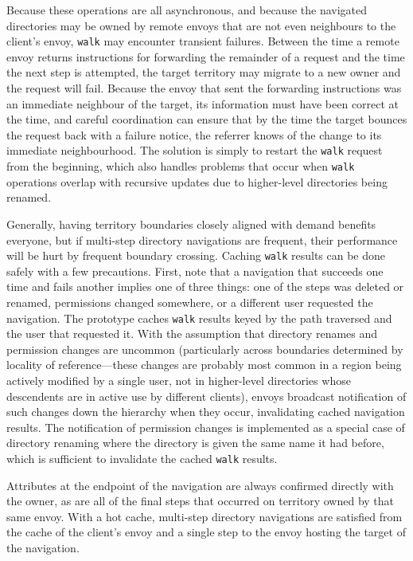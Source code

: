 Because these operations are all asynchronous, and because the navigated directories may be owned by remote envoys that are not even neighbours to the client's envoy, \texttt{walk} may encounter transient failures. Between the time a remote envoy returns instructions for forwarding the remainder of a request and the time the next step is attempted, the target territory may migrate to a new owner and the request will fail. Because the envoy that sent the forwarding instructions was an immediate neighbour of the target, its information must have been correct at the time, and careful coordination can ensure that by the time the target bounces the request back with a failure notice, the referrer knows of the change to its immediate neighbourhood. The solution is simply to restart the \texttt{walk} request from the beginning, which also handles problems that occur when \texttt{walk} operations overlap with recursive updates due to higher-level directories being renamed.

Generally, having territory boundaries closely aligned with demand benefits everyone, but if multi-step directory navigations are frequent, their performance will be hurt by frequent boundary crossing. Caching \texttt{walk} results can be done safely with a few precautions. First, note that a navigation that succeeds one time and fails another implies one of three things: one of the steps was deleted or renamed, permissions changed somewhere, or a different user requested the navigation. The prototype caches \texttt{walk} results keyed by the path traversed and the user that requested it. With the assumption that directory renames and permission changes are uncommon (particularly across boundaries determined by locality of reference---these changes are probably most common in a region being actively modified by a single user, not in higher-level directories whose descendents are in active use by different clients), envoys broadcast notification of such changes down the hierarchy when they occur, invalidating cached navigation results. The notification of permission changes is implemented as a special case of directory renaming where the directory is given the same name it had before, which is sufficient to invalidate the cached \texttt{walk} results.

Attributes at the endpoint of the navigation are always confirmed directly with the owner, as are all of the final steps that occurred on territory owned by that same envoy. With a hot cache, multi-step directory navigations are satisfied from the cache of the client's envoy and a single step to the envoy hosting the target of the navigation.

